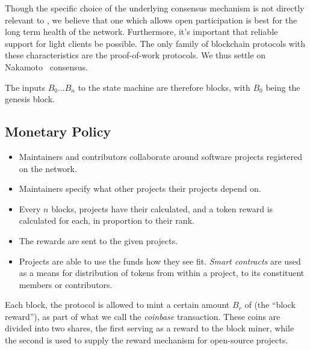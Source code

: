 Though the specific choice of the underlying consensus mechanism is not
directly relevant to \oscoin{}, we believe that one which allows open
participation is best for the long term health of the network. Furthermore,
it's important that reliable support for light clients be possible. The only
family of blockchain protocols with these characteristics are the proof-of-work
protocols. We thus settle on Nakamoto~\cite{bitcoin} consensus.

The inputs $B_0 \dotso B_n$ to the state machine are therefore blocks, with
$B_0$ being the genesis block.


%     

\subsection{Monetary Policy}

\begin{itemize}
    \item Maintainers and contributors collaborate around software projects
        registered on the network.
    \item Maintainers specify what other projects their projects depend on.
    \item Every $n$ blocks, projects have their \osrank{} calculated, and a
        token reward is calculated for each, in proportion to their rank.
    \item The rewards are sent to the given projects.
    \item Projects are able to use the funds how they see fit. \emph{Smart
        contracts} are used as a means for distribution of tokens from within a
        project, to its constituent members or contributors.
\end{itemize}

Each block, the protocol is allowed to mint a certain amount $B_r$ of \oscoin{}
(the ``block reward''), as part of what we call the \emph{coinbase}
transaction. These coins are divided into two shares, the first serving as a
reward to the block miner, while the second is used to supply the reward
mechanism for open-source projects.

